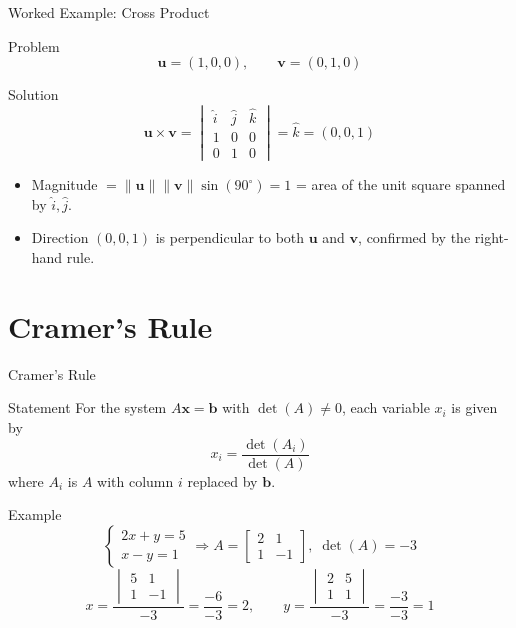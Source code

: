 \documentclass[9pt,aspectratio=169]{beamer}
\newcommand{\vect}[1]{\mathbf{#1}}
\begin{document}
\begin{frame}{Worked Example: Cross Product}
\begin{exampleblock}{Problem}
$$\vect{u}=(1,0,0), \qquad \vect{v}=(0,1,0)$$
\end{exampleblock}
\begin{block}{Solution}
$$\vect{u}\times\vect{v} = \begin{vmatrix}\hat i&\hat j&\hat k\\1&0&0\\0&1&0\end{vmatrix} = \hat k = (0,0,1)$$
\end{block}
\begin{itemize}
\item Magnitude $= \|\vect{u}\|\|\vect{v}\|\sin(90^\circ) = 1$ = area of the unit square spanned by $\hat i,\hat j$.
\item Direction $(0,0,1)$ is perpendicular to both $\vect{u}$ and $\vect{v}$, confirmed by the right-hand rule.
\end{itemize}
\end{frame}

\section{Cramer's Rule}

\begin{frame}{Cramer's Rule}
\begin{block}{Statement}
For the system $A\vect{x}=\vect{b}$ with $\det(A)\neq 0$, each variable $x_i$ is given by
$$x_i = \frac{\det(A_i)}{\det(A)}$$
where $A_i$ is $A$ with column $i$ replaced by $\vect{b}$.
\end{block}
\begin{exampleblock}{Example}
$$\begin{cases} 2x+y=5\\ x-y=1\end{cases} \Rightarrow A=\begin{bmatrix}2&1\\1&-1\end{bmatrix},\; \det(A)=-3$$
$$x = \frac{\begin{vmatrix}5&1\\1&-1\end{vmatrix}}{-3} = \frac{-6}{-3}=2, \qquad y = \frac{\begin{vmatrix}2&5\\1&1\end{vmatrix}}{-3} = \frac{-3}{-3}=1$$
\end{exampleblock}
\end{frame}
\end{document}
